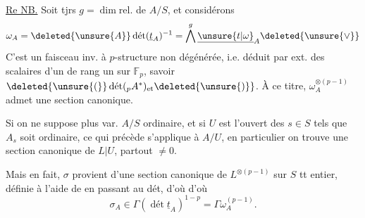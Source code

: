 \uline{Re NB.} Soit tjrs $g=\dim\mathrm{rel.}$ de $A/S$, et considérons
\[
\omega_A=\deleted{\unsure{A}}\operatorname{\text{dét}}(\underline t_A)^{-1}
=\bigwedge^g\underline{\unsure{t|\omega}}_A\deleted{\unsure{\vee}}
\]
C'est un faisceau inv. à $p$-structure non dégénérée, i.e. déduit par ext. des scalaires d'un   de rang un sur $\mathbb F_p$, savoir $\deleted{\unsure{(}}\operatorname{\text{dét}}({}_pA^*)_{\text{et}}\deleted{\unsure{)}}$. À ce titre, $\omega_A^{\otimes(p-1)}$ admet une section canonique.

Si on ne suppose plus var. $A/S$ ordinaire, et si $U$ est l'ouvert des $s\in S$ tels que $A_s$ soit ordinaire,  ce qui précède s'applique à $A/U$, en particulier on trouve une section canonique \inserted{$\sigma$} de $L\vert U$, partout $\ne0$.

Mais en fait, $\sigma$ provient d'une section canonique de $L^{\otimes(p-1)}$ sur $S$ tt entier, définie à l'aide de
en passant au dét, d'où
d'où
\[
\sigma_A\in\Gamma(\operatorname{\text{dét}}\underline t_A)^{1-p}=\Gamma\omega_A^{(p-1)}.
\]

